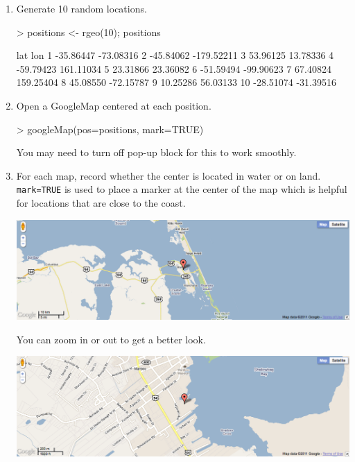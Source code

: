 \begin{enumerate}
\item Generate 10 random locations.

\begin{Schunk}
\begin{Sinput}
> positions <- rgeo(10); positions
\end{Sinput}
\begin{Soutput}
         lat        lon
1  -35.86447  -73.08316
2  -45.84062 -179.52211
3   53.96125   13.78336
4  -59.79423  161.11034
5   23.31866   23.36082
6  -51.59494  -99.90623
7   67.40824  159.25404
8   45.08550  -72.15787
9   10.25286   56.03133
10 -28.51074  -31.39516
\end{Soutput}
\end{Schunk}

\item
Open a GoogleMap centered at each position.

\begin{Schunk}
\begin{Sinput}
> googleMap(pos=positions, mark=TRUE)
\end{Sinput}
\end{Schunk}
You may need to turn off pop-up block for this to work smoothly.

\item
For each map, record whether the center is located in water or on land.  \verb!mark=TRUE!
is used to place a marker at the center of the map which is helpful for locations that are close to 
the coast.  
\begin{center}
\includegraphics[width=.8\textwidth]{images/google-water1}
\end{center}
You can zoom in or out to get a better look.
\begin{center}
\includegraphics[width=.8\textwidth]{images/google-water2}
\end{center}



\end{enumerate}
